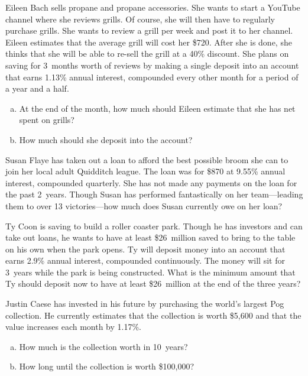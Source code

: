 \documentclass[11pt,letterpaper]{article}
\begin{document}

 Eileen Bach sells propane and propane accessories. She wants to start a YouTube channel where she reviews grills. Of course, she will then have to regularly purchase grills. She wants to review a grill per week and post it to her channel. Eileen estimates that the average grill will cost her \$720. After she is done, she thinks that she will be able to re-sell the grill at a 40\% discount. She plans on saving for 3~months worth of reviews by making a single deposit into an account that earns 1.13\% annual interest, compounded every other month for a period of a year and a half. 
	\begin{enumerate}[(a)]
	\item At the end of the month, how much should Eileen estimate that she has net spent on grills?
	\item How much should she deposit into the account? 
	\end{enumerate}



\newpage



 Susan Flaye has taken out a loan to afford the best possible broom she can to join her local adult Quidditch league. The loan was for \$870 at 9.55\% annual interest, compounded quarterly. She has not made any payments on the loan for the past 2~years. Though Susan has performed fantastically on her team---leading them to over 13 victories---how much does Susan currently owe on her loan?



\newpage



 Ty Coon is saving to build a roller coaster park. Though he has investors and can take out loans, he wants to have at least \$26~million saved to bring to the table on his own when the park opens. Ty will deposit money into an account that earns 2.9\% annual interest, compounded continuously. The money will sit for 3~years while the park is being constructed. What is the minimum amount that Ty should deposit now to have at least \$26~million at the end of the three years?



\newpage



 Justin Caese has invested in his future by purchasing the world's largest Pog collection. He currently estimates that the collection is worth \$5,600 and that the value increases each month by 1.17\%.
	\begin{enumerate}[(a)]
	\item How much is the collection worth in 10~years?
	\item How long until the collection is worth \$100,000?
	\end{enumerate}
\end{document}
